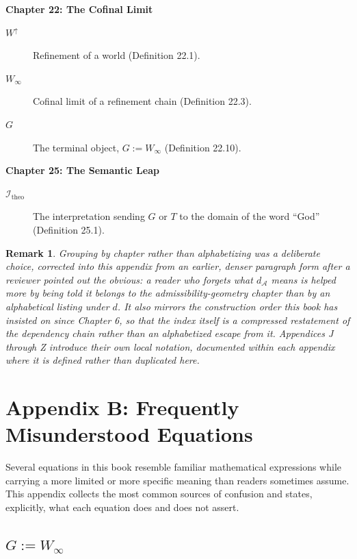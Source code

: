 \documentclass[11pt]{book}
\newtheorem*{appendixremark}{Remark}
\begin{document}
\noindent\textbf{Chapter 22: The Cofinal Limit}
\begin{description}
\item[$W^\uparrow$] Refinement of a world (Definition 22.1).
\item[$W_\infty$] Cofinal limit of a refinement chain (Definition 22.3).
\item[$G$] The terminal object, $G := W_\infty$ (Definition 22.10).
\end{description}

\noindent\textbf{Chapter 25: The Semantic Leap}
\begin{description}
\item[$\mathcal I_{\mathrm{theo}}$] The interpretation sending $G$ or $T$ to the domain of the word ``God'' (Definition 25.1).
\end{description}

\begin{appendixremark}
Grouping by chapter rather than alphabetizing was a deliberate choice, corrected into this appendix from an earlier, denser paragraph form after a reviewer pointed out the obvious: a reader who forgets what $d_{\mathcal A}$ means is helped more by being told it belongs to the admissibility-geometry chapter than by an alphabetical listing under $d$. It also mirrors the construction order this book has insisted on since Chapter 6, so that the index itself is a compressed restatement of the dependency chain rather than an alphabetized escape from it. Appendices J through Z introduce their own local notation, documented within each appendix where it is defined rather than duplicated here.
\end{appendixremark}

\chapter*{Appendix B: Frequently Misunderstood Equations}

Several equations in this book resemble familiar mathematical expressions while carrying a more limited or more specific meaning than readers sometimes assume. This appendix collects the most common sources of confusion and states, explicitly, what each equation does and does not assert.

\section*{$G := W_\infty$}
\end{document}
